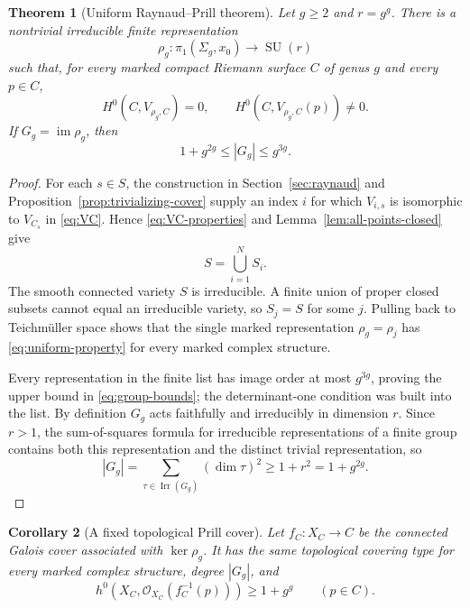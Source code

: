 \documentclass[11pt,reqno]{amsart}
\numberwithin{equation}{section}
\newtheorem{theorem}{Theorem}[section]
\newtheorem{corollary}[theorem]{Corollary}
\theoremstyle{definition}
\theoremstyle{remark}
\newcommand{\OO}{\mathcal O}
\newcommand{\im}{\operatorname{im}}
\newcommand{\SU}{\operatorname{SU}}
\begin{document}
\begin{theorem}[Uniform Raynaud--Prill theorem]\label{thm:uniform}
Let $g\ge2$ and $r=g^g$.  There is a nontrivial irreducible finite representation
\begin{equation}\label{eq:rho-g}
\rho_g:\pi_1(\Sigma_g,x_0)\longrightarrow\SU(r)
\end{equation}
such that, for every marked compact Riemann surface $C$ of genus $g$ and every $p\in C$,
\begin{equation}\label{eq:uniform-property}
H^0(C,V_{\rho_g,C})=0,
\qquad
H^0(C,V_{\rho_g,C}(p))\ne0.
\end{equation}
If $G_g=\im\rho_g$, then
\begin{equation}\label{eq:group-bounds}
1+g^{2g}\le|G_g|\le g^{3g}.
\end{equation}
\end{theorem}

\begin{proof}
For each $s\in S$, the construction in Section~\ref{sec:raynaud} and Proposition~\ref{prop:trivializing-cover} supply an index $i$ for which $V_{i,s}$ is isomorphic to $V_{C_s}$ in \eqref{eq:VC}.  Hence \eqref{eq:VC-properties} and Lemma~\ref{lem:all-points-closed} give
\[
S=\bigcup_{i=1}^N S_i.
\]
The smooth connected variety $S$ is irreducible.  A finite union of proper closed subsets cannot equal an irreducible variety, so $S_j=S$ for some $j$.  Pulling back to Teichm\"uller space shows that the single marked representation $\rho_g=\rho_j$ has \eqref{eq:uniform-property} for every marked complex structure.

Every representation in the finite list has image order at most $g^{3g}$, proving the upper bound in \eqref{eq:group-bounds}; the determinant-one condition was built into the list.  By definition $G_g$ acts faithfully and irreducibly in dimension $r$.  Since $r>1$, the sum-of-squares formula for irreducible representations of a finite group contains both this representation and the distinct trivial representation, so
\[
|G_g|=\sum_{\tau\in\operatorname{Irr}(G_g)}(\dim\tau)^2
\ge1+r^2=1+g^{2g}.
\]
\end{proof}

\begin{corollary}[A fixed topological Prill cover]\label{cor:fixed-prill}
Let $f_C:X_C\to C$ be the connected Galois cover associated with $\ker\rho_g$.  It has the same topological covering type for every marked complex structure, degree $|G_g|$, and
\begin{equation}\label{eq:prill-many-sections}
h^0\!\left(X_C,\OO_{X_C}(f_C^{-1}(p))\right)
\ge1+g^g
\qquad(p\in C).
\end{equation}
\end{corollary}
\end{document}
